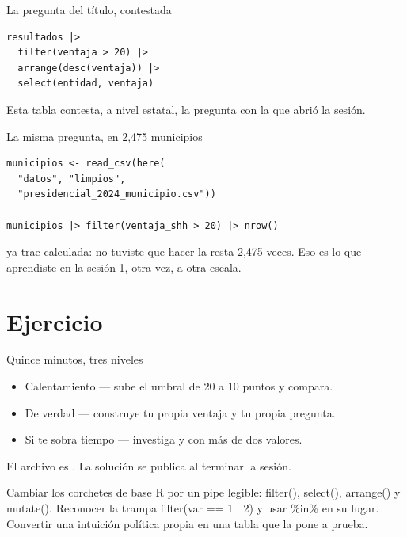 \begin{frame}[fragile]{La pregunta del título, contestada}
\begin{lstlisting}
resultados |>
  filter(ventaja > 20) |>
  arrange(desc(ventaja)) |>
  select(entidad, ventaja)
\end{lstlisting}

  \vspace{0.6em}
  Esta tabla contesta, a nivel estatal, la pregunta con la que abrió la
  sesión.
\end{frame}

\begin{frame}[fragile]{La misma pregunta, en 2{,}475 municipios}
\begin{lstlisting}
municipios <- read_csv(here(
  "datos", "limpios",
  "presidencial_2024_municipio.csv"))

municipios |> filter(ventaja_shh > 20) |> nrow()
\end{lstlisting}

  \vspace{0.5em}
  {\small\color{grisTenue} ya trae 
  calculada: no tuviste que hacer la resta 2{,}475 veces. Eso es lo que
  aprendiste en la sesión 1, otra vez, a otra escala.}
\end{frame}

\section{Ejercicio}

\begin{frame}{Quince minutos, tres niveles}
  \vspace{0.4em}
  \begin{itemize}\setlength{\itemsep}{1.0em}
    \item \ac{Calentamiento} — sube el umbral de 20 a 10 puntos y compara.
    \item \ac{De verdad} — construye tu propia ventaja y tu propia pregunta.
    \item \ac{Si te sobra tiempo} — investiga  y
           con más de dos valores.
  \end{itemize}

  \vspace{1.2em}
  {\small\color{grisTenue}El archivo es . La solución
  se publica al terminar la sesión.}
\end{frame}

\yasabemos
  {Cambiar los corchetes de base R por un pipe legible: filter(), select(), arrange() y mutate().}
  {Reconocer la trampa filter(var == 1 | 2) y usar \%in\% en su lugar.}
  {Convertir una intuición política propia en una tabla que la pone a prueba.}



